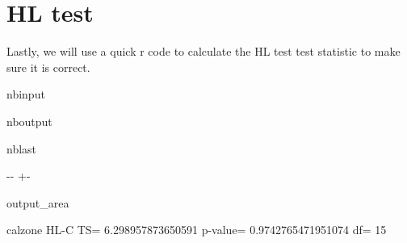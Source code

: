 \documentclass[letterpaper,10pt,english]{sphinxmanual}
\begin{document}
\section{HL test}
\label{\detokenize{notebooks/validation:HL-test}}
\sphinxAtStartPar
Lastly, we will use a quick r code to calculate the HL test test statistic to make sure it is correct.

\begin{sphinxuseclass}{nbinput}
{
\begin{sphinxVerbatim}[commandchars=\\\{\}]
\llap{\color{nbsphinxin}[51]:\,\hspace{\fboxrule}\hspace{\fboxsep}}  
\PYG{p}{[}\PYG{p}{]}\PYG{p}{[}\PYG{p}{]}\PYG{p}{[}\PYG{p}{]}
\end{sphinxVerbatim}
}

\end{sphinxuseclass}
\begin{sphinxuseclass}{nboutput}
\begin{sphinxuseclass}{nblast}
{

\kern-\sphinxverbatimsmallskipamount\kern-\baselineskip
\kern+\FrameHeightAdjust\kern-\fboxrule
\vspace{\nbsphinxcodecellspacing}

\begin{sphinxuseclass}{output_area}
\begin{sphinxuseclass}{}


\begin{sphinxVerbatim}[commandchars=\\\{\}]
calzone HL-C TS= 6.298957873650591 p-value= 0.9742765471951074 df= 15
\end{sphinxVerbatim}



\end{sphinxuseclass}
\end{sphinxuseclass}
}

\end{sphinxuseclass}
\end{sphinxuseclass}
\end{document}
